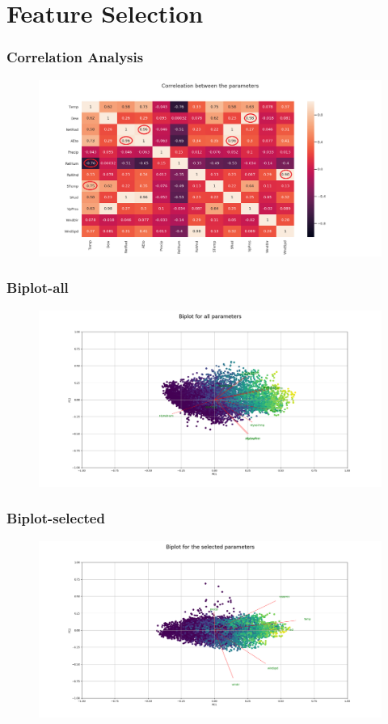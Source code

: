 \section{Feature Selection}


\begin{frame}
\frametitle{Correlation Analysis}
\begin{figure}
	\includegraphics[width=1\textwidth]{images/correleation.png}
\end{figure}
\end{frame}

\begin{frame}
\frametitle{Biplot-all}
\begin{figure}
	\includegraphics[width=1\textwidth]{images/biplot_full.png}
\end{figure}
\end{frame}


\begin{frame}
\frametitle{Biplot-selected}
\begin{figure}
	\includegraphics[width=1\textwidth]{images/biplot_selected.png}
\end{figure}
\end{frame}

